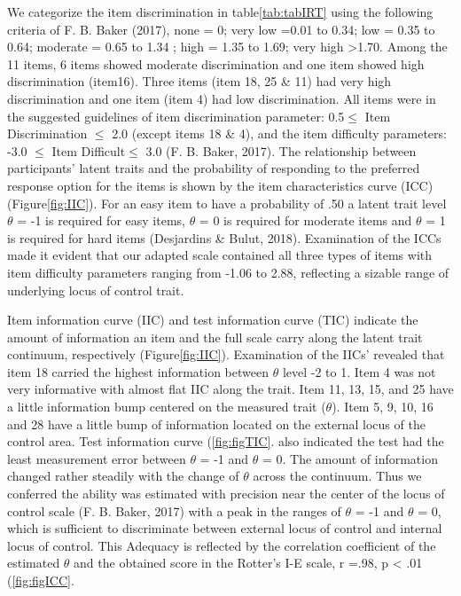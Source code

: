 \documentclass[
  man]{apa6}
\begin{document}
We categorize the item discrimination in table\ref{tab:tabIRT} using the following criteria of F. B. Baker (2017), none = 0; very low =0.01 to 0.34; low = 0.35 to 0.64; moderate = 0.65 to 1.34 ; high = 1.35 to 1.69; very high \textgreater1.70. Among the 11 items, 6 items showed moderate discrimination and one item showed high discrimination (item16). Three items (item 18, 25 \& 11) had very high discrimination and one item (item 4) had low discrimination. All items were in the suggested guidelines of item discrimination parameter: 0.5\(\le\) Item Discrimination \(\le\) 2.0 (except items 18 \& 4), and the item difficulty parameters: -3.0 \(\le\) Item Difficult\(\le\) 3.0 (F. B. Baker, 2017). The relationship between participants' latent traits and the probability of responding to the preferred response option for the items is shown by the item characteristics curve (ICC) (Figure\ref{fig:IIC}). For an easy item to have a probability of .50 a latent trait level \(\theta\) = -1 is required for easy items, \(\theta\) = 0 is required for moderate items and \(\theta\) = 1 is required for hard items (Desjardins \& Bulut, 2018). Examination of the ICCs made it evident that our adapted scale contained all three types of items with item difficulty parameters ranging from -1.06 to 2.88, reflecting a sizable range of underlying locus of control trait.

Item information curve (IIC) and test information curve (TIC) indicate the amount of information an item and the full scale carry along the latent trait continuum, respectively (Figure\ref{fig:IIC}). Examination of the IICs' revealed that item 18 carried the highest information between \(\theta\) level -2 to 1. Item 4 was not very informative with almost flat IIC along the trait. Item 11, 13, 15, and 25 have a little information bump centered on the measured trait (\(\theta\)). Item 5, 9, 10, 16 and 28 have a little bump of information located on the external locus of the control area. Test information curve (\ref{fig:figTIC}. also indicated the test had the least measurement error between \(\theta\) = -1 and \(\theta\) = 0. The amount of information changed rather steadily with the change of \(\theta\) across the continuum. Thus we conferred the ability was estimated with precision near the center of the locus of control scale (F. B. Baker, 2017) with a peak in the ranges of \(\theta\) = -1 and \(\theta\) = 0, which is sufficient to discriminate between external locus of control and internal locus of control. This Adequacy is reflected by the correlation coefficient of the estimated \(\theta\) and the obtained score in the Rotter's I-E scale, r =.98, p \textless{} .01 (\ref{fig:figICC}.
\end{document}
